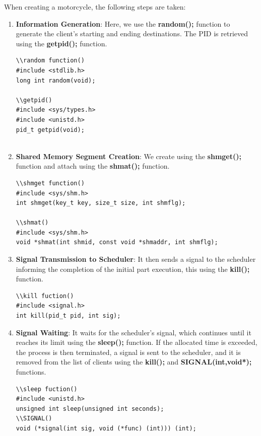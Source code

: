 When creating a motorcycle, the following steps are taken:
\begin{enumerate}
  \item \textbf{Information Generation}: Here, we use the \textbf{random();} function to generate the client's starting and ending destinations. The PID is retrieved using the \textbf{getpid();} function.\\
  \begin{lstlisting}[style=customc, caption={random and pid functions}]
\\random function()
#include <stdlib.h>
long int random(void);

\\getpid()
#include <sys/types.h>
#include <unistd.h>
pid_t getpid(void);


\end{lstlisting}


  \item \textbf{Shared Memory Segment Creation}: We create using the \textbf{shmget();} function and attach using the \textbf{shmat();} function.
    \begin{lstlisting}[style=customc, caption={shmget and shmat functions}]
\\shmget function()
#include <sys/shm.h>
int shmget(key_t key, size_t size, int shmflg);

\\shmat()
#include <sys/shm.h>
void *shmat(int shmid, const void *shmaddr, int shmflg);
\end{lstlisting}


  \item \textbf{Signal Transmission to Scheduler}: It then sends a signal to the scheduler informing the completion of the initial part execution, this using the \textbf{kill();} function.\\
    \begin{lstlisting}[style=customc, caption={kill function}]
\\kill fuction()
#include <signal.h>
int kill(pid_t pid, int sig);

\end{lstlisting}


  \item \textbf{Signal Waiting}: It waits for the scheduler's signal, which continues until it reaches its limit using the \textbf{sleep();} function. If the allocated time is exceeded, the process is then terminated, a signal is sent to the scheduler, and it is removed from the list of clients using the \textbf{kill();} and \textbf{SIGNAL(int,void*);} functions.\\
  \newpage
    \begin{lstlisting}[style=customc, caption={sleep and signal functions}]
\\sleep fuction()
#include <unistd.h>
unsigned int sleep(unsigned int seconds);
\\SIGNAL()
void (*signal(int sig, void (*func) (int))) (int);


\end{lstlisting}
\end{enumerate}
